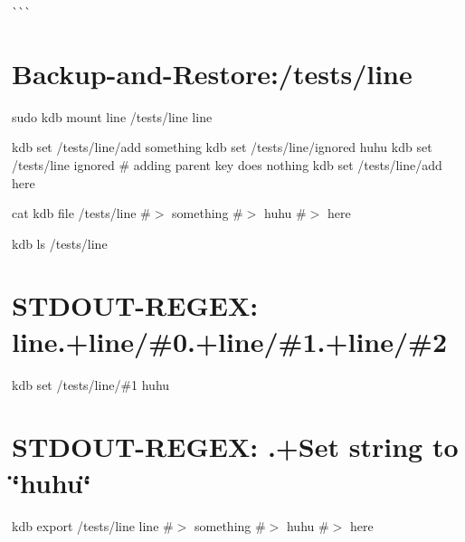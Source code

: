 \begin{DoxyCode}{0}
\end{DoxyCode}


\`{}\`{}\`{} \hypertarget{autotoc_md372_autotoc_md375}{}\section{Backup-\/and-\/\+Restore\+:/tests/line}\label{autotoc_md372_autotoc_md375}
sudo kdb mount line /tests/line line

kdb set /tests/line/add something kdb set /tests/line/ignored huhu kdb set /tests/line ignored \# adding parent key does nothing kdb set /tests/line/add here

cat {\ttfamily kdb file /tests/line} \#$>$ something \#$>$ huhu \#$>$ here

kdb ls /tests/line \hypertarget{autotoc_md372_autotoc_md376}{}\section{S\+T\+D\+O\+U\+T-\/\+R\+E\+G\+E\+X\+: line.+line/\#0.+line/\#1.+line/\#2}\label{autotoc_md372_autotoc_md376}
kdb set /tests/line/\#1 huhu \hypertarget{autotoc_md372_autotoc_md377}{}\section{S\+T\+D\+O\+U\+T-\/\+R\+E\+G\+E\+X\+: .+\+Set string to \char`\"{}huhu\char`\"{}}\label{autotoc_md372_autotoc_md377}
kdb export /tests/line line \#$>$ something \#$>$ huhu \#$>$ here

